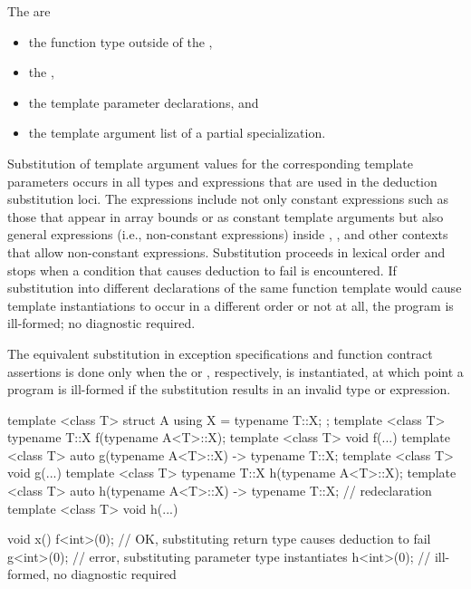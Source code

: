 \pnum
{}%
The  are
\begin{itemize}
\item the function type outside of the ,
\item the ,
\item the template parameter declarations, and
\item the template argument list of a partial specialization.
\end{itemize}
Substitution of template argument values for the corresponding template
parameters occurs in all types and expressions that are used
in the deduction substitution loci.
The expressions include not only
constant expressions such as those that appear in array bounds or as constant
template arguments but also general expressions (i.e., non-constant expressions)
inside , , and other contexts that allow non-constant
expressions. Substitution proceeds in lexical order and stops when
a condition that causes deduction to fail is encountered.
If substitution into different declarations of the same function template would
cause template instantiations to occur in a different order or not at all,
the program is ill-formed; no diagnostic required.
\begin{note}
The equivalent substitution in
exception specifications
and function contract assertions
is done only when
the 
or , respectively,
is instantiated,
at which point a program is ill-formed
if the substitution results in an invalid type or expression.
\end{note}
\begin{example}
\begin{codeblock}
template <class T> struct A { using X = typename T::X; };
template <class T> typename T::X f(typename A<T>::X);
template <class T> void f(...) { }
template <class T> auto g(typename A<T>::X) -> typename T::X;
template <class T> void g(...) { }
template <class T> typename T::X h(typename A<T>::X);
template <class T> auto h(typename A<T>::X) -> typename T::X;   // redeclaration
template <class T> void h(...) { }

void x() {
  f<int>(0);        // OK, substituting return type causes deduction to fail
  g<int>(0);        // error, substituting parameter type instantiates 
  h<int>(0);        // ill-formed, no diagnostic required
}
\end{codeblock}
\end{example}

